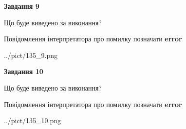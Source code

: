 \documentclass[12pt, ukrainian]{article}
\begin{document}
{{\begin {center}\textbf{Завдання 9}\end {center}}\par
Що буде виведено за виконання? \par
Повідомлення інтерпретатора про помилку позначати \textbf{error}

\begin{center}
	{../pict/135_9.png}
\end{center}
\newpage

{\begin {center}\textbf{Завдання 10}\end {center}}\par
Що буде виведено за виконання? \par
Повідомлення інтерпретатора про помилку позначати \textbf{error}

\begin{center}
	{../pict/135_10.png}
\end{center}
\newpage

}
\end{document}
